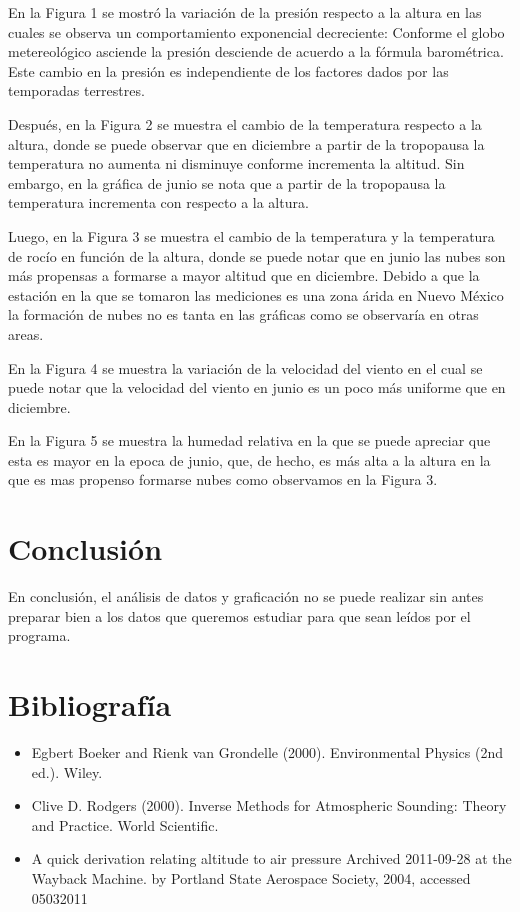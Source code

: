 \documentclass{article}
\begin{document}
En la Figura 1 se mostró la variación de la presión respecto a la altura en las cuales se observa un comportamiento exponencial decreciente: Conforme el globo metereológico asciende la presión desciende de acuerdo a la fórmula barométrica. Este cambio en la presión es independiente de los factores dados por las temporadas terrestres.

Después, en la Figura 2 se muestra el cambio de la temperatura respecto a la altura, donde se puede observar que en diciembre a partir de la tropopausa la temperatura no aumenta ni disminuye conforme incrementa la altitud. Sin embargo, en la gráfica de junio se nota que a partir de la tropopausa la temperatura incrementa con respecto a la altura.

Luego, en la Figura 3 se muestra el cambio de la temperatura y la temperatura de rocío en función de la altura, donde se puede notar que en junio las nubes son más propensas a formarse a mayor altitud que en diciembre. Debido a que la estación en la que se tomaron las mediciones es una zona árida en Nuevo México la formación de nubes no es tanta en las gráficas como se observaría en otras areas.

En la Figura 4 se muestra la variación de la velocidad del viento en el cual se puede notar que la velocidad del viento en junio es un poco más uniforme que en diciembre.

En la Figura 5 se muestra la humedad relativa en la que se puede apreciar que esta es mayor en la epoca de junio, que, de hecho, es más alta a la altura en la que es mas propenso formarse nubes como observamos en la Figura 3.

\section{Conclusión}

En conclusión, el análisis de datos y graficación no se puede realizar sin antes preparar bien a los datos que queremos estudiar para que sean leídos por el programa.

\newpage

\section{Bibliografía}
\begin{itemize}
\item Egbert Boeker and Rienk van Grondelle (2000). Environmental Physics (2nd ed.). Wiley.
\item Clive D. Rodgers (2000). Inverse Methods for Atmospheric Sounding: Theory and Practice. World Scientific.
\item A quick derivation relating altitude to air pressure Archived 2011-09-28 at the Wayback Machine. by Portland State Aerospace Society, 2004, accessed 05032011
\end{itemize}
\end{document}
